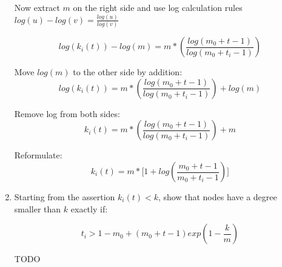 \begin{enumerate}
	Now extract $m$ on the right side and use log calculation rules $log(u) - log(v) = \frac{log(u)}{log(v)}$
	
	\begin{equation*}
		log(k_i(t)) - log(m) = m * (\frac{log(m_0 + t - 1)}{log(m_0 + t_i - 1)})
	\end{equation*}
	
	Move $log(m)$ to the other side by addition:
	\begin{equation*}
		log(k_i(t)) = m * (\frac{log(m_0 + t - 1)}{log(m_0 + t_i - 1)}) + log(m)
	\end{equation*}

	Remove log from both sides:
	\begin{equation*}
		k_i(t) = m * (\frac{log(m_0 + t - 1)}{log(m_0 + t_i - 1)}) + m
	\end{equation*}

	Reformulate:
	\begin{equation*}
		k_i(t) = m * \biggl[1 + log(\frac{m_0 + t - 1}{m_0 + t_i - 1})\biggr]
	\end{equation*}
	
	\item Starting from the assertion $k_i(t) < k$, show that nodes have a degree smaller than $k$ exactly if:
	
	\begin{equation}
		t_i > 1 - m_0 + (m_0 + t - 1) exp(1 - \frac{k}{m})
	\end{equation}
	
	TODO

\end{enumerate}